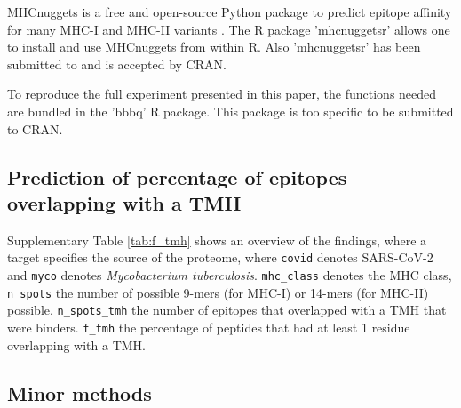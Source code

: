 
MHCnuggets is a free and open-source Python package to predict 
epitope affinity for many MHC-I and MHC-II variants \cite{shao2020high}.
The R package 'mhcnuggetsr' allows one to install and use MHCnuggets
from within R.
Also 'mhcnuggetsr' has been submitted to and is accepted by CRAN.


To reproduce the full experiment presented in this paper,
the functions needed are bundled in the 'bbbq' R package.
This package is too specific to be submitted to CRAN.

\clearpage

\subsection{Prediction of percentage of epitopes overlapping with a TMH}

Supplementary Table \ref{tab:f_tmh} shows an overview of the findings,
where a target specifies the source of the proteome,
where \verb;covid; denotes SARS-CoV-2 and \verb;myco; denotes
\emph{Mycobacterium tuberculosis}. \verb;mhc_class; denotes the MHC
class, \verb;n_spots; the number of possible 9-mers (for MHC-I) 
or 14-mers (for MHC-II) possible. \verb;n_spots_tmh; the
number of epitopes that overlapped with a TMH that were binders. 
\verb;f_tmh; the percentage of peptides that had at least 1 residue
overlapping with a TMH.



\clearpage

\subsection{Minor methods}

